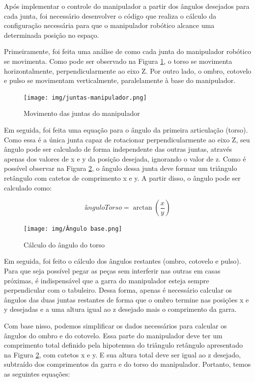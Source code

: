 Após implementar o controle do manipulador a  partir dos ângulos desejados para cada junta, foi necessário desenvolver o código que realiza o cálculo da configuração necessária para que o manipulador robótico alcance uma determinada posição no espaço.

Primeiramente, foi feita uma análise de como cada junta do manipulador robótico se movimenta.
Como pode ser observado na Figura \ref{fig:juntasManipulador},
o torso se movimenta horizontalmente, perpendicularmente ao eixo Z.
Por outro lado, o ombro, cotovelo e pulso se movimentam verticalmente, paralelamente à base do manipulador.

\begin{figure}[H]
    \centering
    \caption{Movimento das juntas do manipulador}
    \texttt{[image: img/juntas-manipulador.png]}
    \label{fig:juntasManipulador}
\end{figure}

Em seguida, foi feita uma equação para o ângulo da primeira articulação (torso).
Como essa é a única junta capaz de rotacionar perpendicularmente ao eixo Z, seu ângulo pode ser calculado de forma independente das outras juntas, 
através apenas dos valores de x e y da posição desejada, ignorando o valor de z.
Como é possível observar na Figura \ref{fig:calculoAnguloTorso}, o ângulo dessa junta deve formar um triângulo retângulo com catetos de comprimento x e y.
A partir disso, o ângulo pode ser calculado como:

\begin{dmath}
\label{eq:anguloTorso}
    ânguloTorso = \arctan\left(\frac{x}{y}\right)
\end{dmath}

\begin{figure}[H]
    \centering
    \caption{Cálculo do ângulo do torso}
    \texttt{[image: img/Ângulo base.png]}
    \label{fig:calculoAnguloTorso}
\end{figure}

Em seguida, foi feito o cálculo dos ângulos restantes (ombro, cotovelo e pulso).
Para que seja possível pegar as peças sem interferir nas outras em casas próximas, é indispensável que a garra do manipulador esteja sempre perpendicular com o tabuleiro.
Dessa forma, apenas é necessário calcular os ângulos das duas juntas restantes de forma que o ombro termine nas posições x e y desejadas e a uma altura igual ao z desejado mais o comprimento da garra.

Com base nisso, podemos simplificar os dados necessários para calcular os ângulos do ombro e do cotovelo.
Essa parte do manipulador deve ter um comprimento total definido pela hipotenusa do triângulo retângulo apresentado na Figura \ref{fig:calculoAnguloTorso}, com catetos x e y.
E sua altura total deve ser igual ao z desejado, subtraído dos comprimentos da garra e do torso do manipulador. Portanto, temos as seguintes equações:

